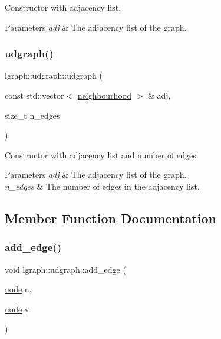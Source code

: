 Constructor with adjacency list. 


\begin{DoxyParams}{Parameters}
{\em adj} & The adjacency list of the graph. \\
\hline
\end{DoxyParams}
\mbox{\label{classlgraph_1_1udgraph_a84bb75d8ec5b2621af504e7f7d843827}} 
\subsubsection{\texorpdfstring{udgraph()}{udgraph()}\hspace{0.1cm}{\footnotesize\ttfamily [2/2]}}
{\footnotesize\ttfamily lgraph\+::udgraph\+::udgraph (\begin{DoxyParamCaption}\item[{const std\+::vector$<$ \hyperlink{namespacelgraph_a052e7766c13f3a43cec0aec8173fdede}{neighbourhood} $>$ \&}]{adj,  }\item[{size\+\_\+t}]{n\+\_\+edges }\end{DoxyParamCaption})}



Constructor with adjacency list and number of edges. 


\begin{DoxyParams}{Parameters}
{\em adj} & The adjacency list of the graph. \\
\hline
{\em n\+\_\+edges} & The number of edges in the adjacency list. \\
\hline
\end{DoxyParams}


\subsection{Member Function Documentation}
\mbox{\label{classlgraph_1_1udgraph_a4b847dd4d6d2e814f30bcddccc16cfc6}} 
\subsubsection{\texorpdfstring{add\+\_\+edge()}{add\_edge()}\hspace{0.1cm}{\footnotesize\ttfamily [1/2]}}
{\footnotesize\ttfamily void lgraph\+::udgraph\+::add\+\_\+edge (\begin{DoxyParamCaption}\item[{\hyperlink{namespacelgraph_a397169dd66adf725210a30fb7251773e}{node}}]{u,  }\item[{\hyperlink{namespacelgraph_a397169dd66adf725210a30fb7251773e}{node}}]{v }\end{DoxyParamCaption})\hspace{0.3cm}{\ttfamily [virtual]}}



